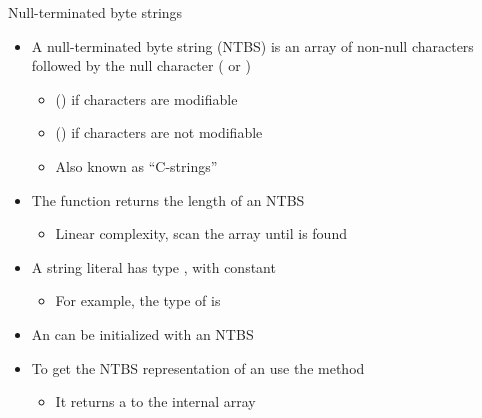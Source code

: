 \begin{frame}{Null-terminated byte strings}
  \begin{itemize}
  \item<1-> A null-terminated byte string (NTBS) is an array of non-null characters
    followed by the null character ( or \code{\bslashz})
    \begin{itemize}
    \item {} () if characters are modifiable
    \item {} () if characters are not
      modifiable
    \item Also known as ``C-strings''
    \end{itemize}
  \item<2-> The  function returns the length of an NTBS
    \begin{itemize}
    \item Linear complexity, scan the array until \code{\bslashz} is found
    \end{itemize}
  \item<3-> A string literal has type , with  constant
    \begin{itemize}
    \item For example, the type of  is 
    \end{itemize}
  \item<4-> An  can be initialized with an NTBS
  \item<4-> To get the NTBS representation of an  use the
     method
    \begin{itemize}
    \item It returns a  to the internal array
    \end{itemize}
  \end{itemize}

\end{frame}

